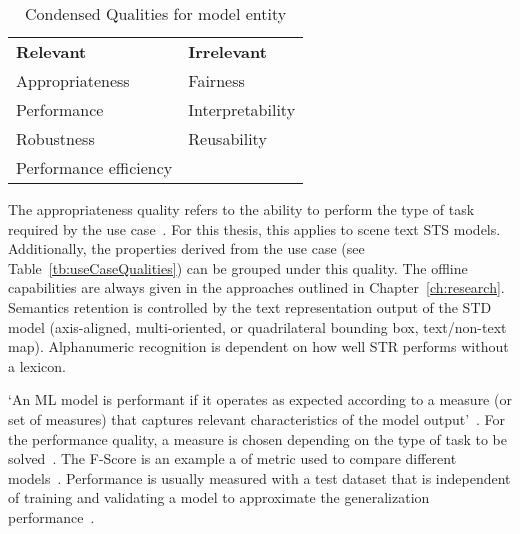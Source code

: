 \begin{table}[h]
    \centering\scriptsize
    \begin{tabular}{l l}
        \textbf{Relevant}                & \textbf{Irrelevant} \\
        Appropriateness         & Fairness  \\
        Performance             & Interpretability \\
        Robustness              & Reusability \\
        Performance efficiency  & \\
    \end{tabular}
    \caption{Condensed Qualities for model entity\label{tb:condensedQualities}}
\end{table}

The appropriateness quality refers to the ability to perform the type of task required by
the use case~\citep{siebert_construction_2021,nakamichi_requirements-driven_2020}.
For this thesis, this applies to scene text \ac{STS} models.
Additionally, the properties derived from the use case (see
Table~\ref{tb:useCaseQualities}) can be grouped under this quality.
The offline capabilities are always given in the approaches outlined in Chapter~\ref{ch:research}.
Semantics retention is controlled by the text representation output of the \ac{STD} model (axis-aligned,
multi-oriented, or quadrilateral bounding box, text/non-text map).
Alphanumeric recognition is dependent on how well \ac{STR} performs without a lexicon.

`An ML model is performant if it operates as expected according to a measure (or set of measures)
that captures relevant characteristics of the model output'~\citep{ashmore_assuring_2021}.
For the performance quality, a measure is chosen depending on the type of task to be
solved~\citep{siebert_construction_2021}.
The F-Score is an example a of metric used to compare different
models~\cite{chen_text_2021, long_scene_2021}.
Performance is usually measured with a test dataset that is independent of training and validating
a model to approximate the generalization performance~\citep{goodfellow_deep_2016,
nakamichi_requirements-driven_2020}.

